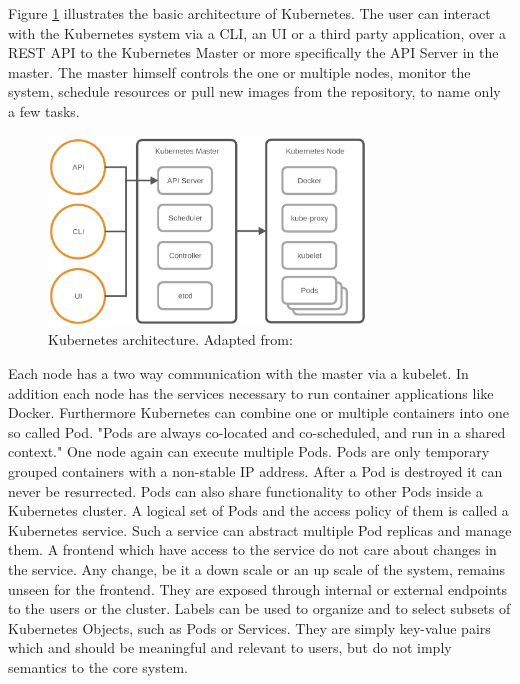 Figure \ref{fig:kubernetes_architecture} illustrates the basic architecture of Kubernetes.
The user can interact with the Kubernetes system via a \ac{CLI}, an \ac{UI} or a third party application, over a \ac{REST} \ac{API} to the Kubernetes Master or more specifically the \ac{API} Server in the master.
The master himself controls the one or multiple nodes, monitor the system, schedule resources or pull new images from the repository, to name only a few tasks.

\begin{figure}[H]
    \centering
    \includegraphics[width=0.75\textwidth]{resources/images/kubernetes_architecture.png}
    \caption[Kubernetes architecture]{Kubernetes architecture. Adapted from: \autocite[p. 4]{MSV:2016}}
    \label{fig:kubernetes_architecture}
\end{figure}

Each node has a two way communication with the master via a kubelet.
In addition each node has the services necessary to run container applications like Docker.
Furthermore Kubernetes can combine one or multiple containers into one so called Pod.\autocite[cf.][p. 7]{Mulyana:2016}
"Pods are always co-located and co-scheduled, and run in a shared context."\autocite{Kubernetes:pods:2016}
One node again can execute multiple Pods.
Pods are only temporary grouped containers with a non-stable \ac{IP} address.
After a Pod is destroyed it can never be resurrected.
Pods can also share functionality to other Pods inside a Kubernetes cluster.
A logical set of Pods and the access policy of them is called a Kubernetes service.
Such a service can abstract multiple Pod replicas and manage them.
A frontend which have access to the service do not care about changes in the service.
Any change, be it a down scale or an up scale of the system, remains unseen for the frontend.
They are exposed through internal or external endpoints to the users or the cluster.\autocite[cf.][p. 11]{MSV:2016}
Labels can be used to organize and to select subsets of Kubernetes Objects, such as Pods or Services.\autocite[cf.]{Kubernetes:labels:2016}
They are simply key-value pairs which and should be meaningful and relevant to users, but do not imply semantics to the core system.\autocite[cf.]{Kubernetes:labels:2016}

